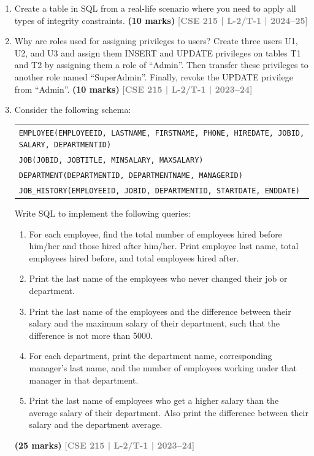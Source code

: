 \documentclass[12pt,a3paper]{article}
\newcommand{\yr}[1]{\hfill\textcolor{gray}{\small\textbf{[#1]}}}
\newcommand{\mk}[1]{\textcolor{orange!70!black}{\small\textbf{(#1 marks)}}}
\begin{document}
\begin{enumerate}
\item Create a table in SQL from a real-life scenario where you need to apply all types of integrity constraints.
\mk{10} \yr{CSE 215 | L-2/T-1 | 2024--25}

\item Why are roles used for assigning privileges to users? Create three users U1, U2, and U3 and assign them INSERT and UPDATE privileges on tables T1 and T2 by assigning them a role of ``Admin''. Then transfer these privileges to another role named ``SuperAdmin''. Finally, revoke the UPDATE privilege from ``Admin''.
\mk{10} \yr{CSE 215 | L-2/T-1 | 2023--24}

\item Consider the following schema:
\begin{center}
\begin{tabular}{l}
\texttt{EMPLOYEE(EMPLOYEEID, LASTNAME, FIRSTNAME, PHONE, HIREDATE, JOBID, SALARY, DEPARTMENTID)}\\
\texttt{JOB(JOBID, JOBTITLE, MINSALARY, MAXSALARY)}\\
\texttt{DEPARTMENT(DEPARTMENTID, DEPARTMENTNAME, MANAGERID)}\\
\texttt{JOB\_HISTORY(EMPLOYEEID, JOBID, DEPARTMENTID, STARTDATE, ENDDATE)}
\end{tabular}
\end{center}
Write SQL to implement the following queries:
\begin{enumerate}
  \item For each employee, find the total number of employees hired before him/her and those hired after him/her. Print employee last name, total employees hired before, and total employees hired after.
  \item Print the last name of the employees who never changed their job or department.
  \item Print the last name of the employees and the difference between their salary and the maximum salary of their department, such that the difference is not more than 5000.
  \item For each department, print the department name, corresponding manager's last name, and the number of employees working under that manager in that department.
  \item Print the last name of employees who get a higher salary than the average salary of their department. Also print the difference between their salary and the department average.
\end{enumerate}
\mk{25} \yr{CSE 215 | L-2/T-1 | 2023--24}


\end{enumerate}
\end{document}
